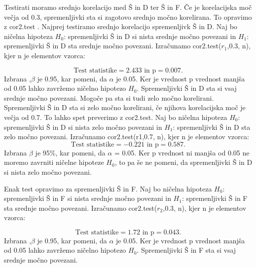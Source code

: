 \documentclass[a4paper,11pt]{article}
\begin{document}
Testirati moramo srednjo korelacijo med Š in D ter Š in F. Če je korelacijska moč večja od 0.3, spremenljivki sta si zagotovo srednjo močno korelirana. To opravimo z cor2.test \cite{github}. Najprej testiramo srednjo korelacijo spremenljivk Š in D. Naj bo ničelna hipoteza \(H_0\): spremenljivki Š in D si nista srednje močno povezani in \(H_1\): spremenljivki Š in D sta srednje močno povezani. Izračunamo cor2.test(\(r_1\),0.3, n), kjer n je elementov vzorca:

\[\text{Test statistike} = 2.433 \text{ in p} =  0.007.\]
Izbrana ,\(\beta\) je 0.95, kar pomeni, da \(\alpha\) je 0.05. Ker je vrednost p vrednost manjša od 0.05 lahko zavržemo ničelno hipotezo \(H_0\). Spremenljivki Š in D sta si vsaj srednje močno povezani. Mogoče pa sta si tudi zelo močno korelirani. Spremenljivki Š in D sta si zelo močno korelirani, če njihova korelacijska moč je večja od 0.7. To lahko spet preverimo z cor2.test. Naj bo ničelna hipoteza \(H_0\): spremenljivki Š in D si nista zelo močno povezani in \(H_1\): spremenljivki Š in D sta zelo močno povezani. Izračunamo cor2.test(r1,0.7, n), kjer n je elementov vzorca:
\[\text{Test statistike} = -0.221 \text{ in p} = 0.587.\]
Izbrana \(\beta\) je 95\%, kar pomeni, da \(\alpha\) = 0.05. Ker p vrednost ni manjša od 0.05 ne moremo zavrniti ničelne hipoteze \(H_0\), to pa še ne pomeni, da spremenljivki Š in D si nista zelo močno povezani.

Enak test opravimo za spremenljivki Š in F. Naj bo ničelna hipoteza \(H_0\): spremenljivki Š in F si nista srednje močno povezani in \(H_1\): spremenljivki Š in F sta srednje močno povezani. Izračunamo cor2.test(\(r_2\),0.3, n), kjer n je elementov vzorca:

\[\text{Test statistike} = 1.72 \text{ in p} =  0.043.\]
Izbrana ,\(\beta\) je 0.95, kar pomeni, da \(\alpha\) je 0.05. Ker je vrednost p vrednost manjša od 0.05 lahko zavržemo ničelno hipotezo \(H_0\). Spremenljivki Š in F sta si vsaj srednje močno povezani.
\end{document}
